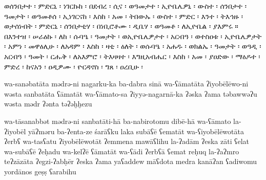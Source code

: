 
\begin{ethiopictext}
    ወሰንበታተ ፡ ምድርኒ ፡ ነገርኩከ ፡ በደብረ ፡ ሲና ፡ ወዓመታተ ፡
    ኢዮቤሌዎኒ ፡ ውስተ ፡ ሰንበታተ ፡ ዓመታት ፡ ወዓመቶሰ ፡ ኢነገርናከ ፡
    እስከ ፡ አመ ፡ ትበውኡ ፡ ውስተ ፡ ምድር ፡ እንተ ፡ ትእኅዙ ፡
    ወታሰነብት ፡ ምድርኒ ፡ ሰንበታቲሃ ፡ በነቢሮቶሙ ፡ ዲቤሃ ፡ 
    ወዓመቶ ፡ ለኢዮቤል ፡ ያእምሩ ። 
    በእንተዝ ፡ ሠራዕኩ ፡ ለከ ፡ 
    ሱባዔ ፡ ዓመታት ፡ ወኢዮቤሌዎታተ ፡ አርብዓ ፡ ወተስዐቱ ፡ ኢዮቤሌዎታት ፡
    አምነ ፡ መዋዕሊሁ ፡ ለአዳም ፡ እስከ ፡ ዛቲ ፡ ዕለት ፡ ወሱባዔ ፡
    አሐዱ ፡ ወክልኤ ፡ ዓመታት ፡ ወዓዲ ፡ አርብዓ ፡ ዓመት ፡ 
    ርሑቅ ፡ ለአእምሮ ፡ ትእዛዛተ ፡ እግዚአብሔር ፡ እስከ ፡ አመ ፡ ያዐድው ፡
    ማዕዶተ ፡ ምድረ ፡ ከናአን ፡ ዐዲዎሙ ፡ ዮርዳኖስ ፡ ግጸ ፡ ዐረቢሁ ፡
\end{ethiopictext}
\begin{transliteration}
    wa-sanəbatāta mədrə-ni nagarku-ka ba-dabra sinā wa-ʕāmatāta
    ʔiyobēlēwo-ni wəsta sanbatāta ʕāmatāt wa-ʕāmato-sa ʔiyyə-nagarnā-ka
    ʔəska ʔama təbawwəʔu wəsta mədr ʔənta təʔəḫḫezu

    wa-tāsanabbət mədrə-ni sanbatāti-hā ba-nabirotomu dibē-hā
    wa-ʕāmato la-ʔiyobēl yāʔməru
    ba-ʔenta-ze śarāʕku laka
    subāʕē ʕematāt wa-ʕiyobēlēwotāta ʔerbʕ wa-tasʕatu ʔiyobēlēwotāt
    ʔemmena mawāʕlihu la-ʔadām ʔeska zāti ʕelat wa-subāʕē
    ʔeḥadu wa-kelʔē ʕāmatāt wa-ʕādi ʔerbʕā ʕemat
    reḥuq la-ʔaʔmro teʔzāzāta ʔegzi-ʔabḥēr ʔeska ʔama yaʕaddew
    māʕdota medra kanāʔan ʕadiwomu yordānos geṣṣ ʕarabihu

\end{transliteration}

